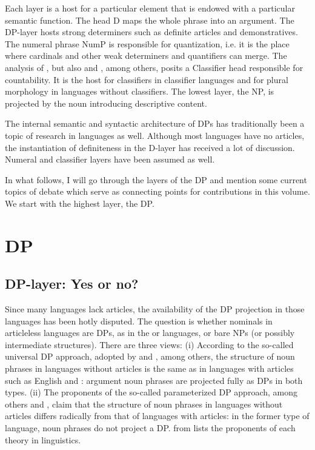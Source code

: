 \documentclass[output=paper]{langscibook}
\begin{document}
Each layer is a host for a particular element that is endowed with a particular semantic function. The head D maps the whole phrase into an argument. The DP-layer hosts strong determiners such as definite articles and demonstratives. The numeral phrase NumP is responsible for quantization, i.e. it is the place where cardinals and other weak determiners and quantifiers can merge. The analysis of \citet{Borer2005}, but also \citet{Cheng.Heycock2017} and \citet{Cheng.Sybesma1999}, among others, posits a Classifier head responsible for countability. It is the host for classifiers in classifier languages and for plural morphology in languages without classifiers. The lowest layer, the NP, is projected by the noun introducing descriptive content.

The internal semantic and syntactic architecture of DPs has traditionally been a topic of research in  languages as well. Although most  languages have no articles, the instantiation of definiteness in the D-layer has received a lot of discussion. Numeral and classifier layers have been assumed as well.

In what follows, I will go through the layers of the DP and mention some current topics of debate which serve as connecting points for contributions in this volume. We start with the highest layer, the DP.

\section{DP}
\subsection{DP-layer: Yes or no?}

Since many  languages lack articles, the availability of the DP projection in those languages has been hotly disputed. The question is whether nominals in articleless  languages are DPs, as in the  or  languages, or bare NPs (or possibly intermediate structures). There are three views: (i) According to the so-called universal DP approach, adopted by \citet{Longobardi1994} and \citet{Matthewson1998}, among others, the structure of noun phrases in languages without articles is the same as in languages with articles such as English and : argument noun phrases are projected fully as DPs in both types. (ii) The proponents of the so-called parameterized DP approach, among others \citet{Chierchia1998} and \citet{Baker2003}, claim that the structure of noun phrases in languages without articles differs radically from that of languages with articles: in the former type of language, noun phrases do not project a DP.  from \citet{Veselovska2014} lists the proponents of each theory in  linguistics.
\end{document}
